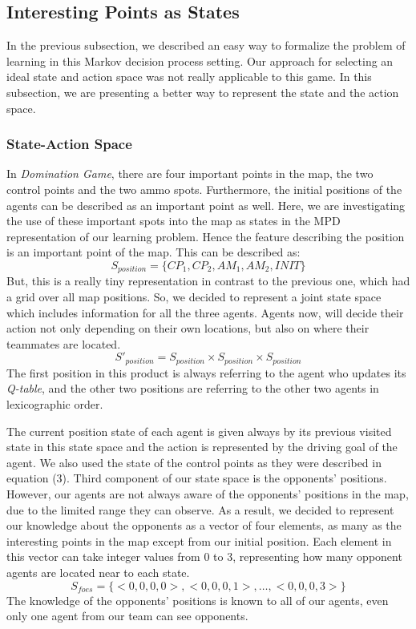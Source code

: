 \documentclass[conference]{IEEEtran}
\begin{document}
\subsection{Interesting Points as States}
In the previous subsection, we described an easy way to formalize the problem of learning in this Markov decision process setting. Our approach for selecting an ideal state and action space was not really applicable to this game. In this subsection, we are presenting a better way to represent the state and the action space.
\subsubsection{State-Action Space}
In \textit{Domination Game}, there are four important points in the map, the two control points and the two ammo spots. Furthermore, the initial positions of the agents can be described as an important point as well. Here, we are investigating the use of these important spots into the map as states in the MPD representation of our learning problem. Hence the feature describing the position is an important point of the map. This can be described as:
\begin{equation}
S_{position} = \lbrace CP_1, CP_2, AM_1, AM_2, INIT  \rbrace
\end{equation}
But, this is a really tiny representation in contrast to the previous one, which had a grid over all map positions. So, we decided to represent a joint state space which includes information for all the three agents. Agents now, will decide their action not only depending on their own locations, but also on where their teammates are located.
\begin{equation}
S'_{position} = S_{position} \times S_{position} \times S_{position}
\end{equation}
The first position in this product is always referring to the agent who updates its \textit{Q-table}, and the other two positions are referring to the other two agents in lexicographic order.

The current position state of each agent is given always by its previous visited state in this state space and the action is represented by the driving goal of the agent. We also used the state of the control points as they were described in equation (3). Third component of our state space is the opponents' positions. However, our agents are not always aware of the opponents' positions in the map, due to the limited range they can observe. As a result, we decided to represent our knowledge about the opponents as a vector of four elements, as many as the interesting points in the map except from our initial position. Each element in this vector can take integer values from $0$ to $3$, representing how many opponent agents are located near to each state.
\begin{equation}
S_{foes} = \lbrace <0,0,0,0>, <0,0,0,1>, \ldots, <0,0,0,3>  \rbrace
\end{equation}
The knowledge of the opponents' positions is known to all of our agents, even only one agent from our team can see opponents.
\end{document}
